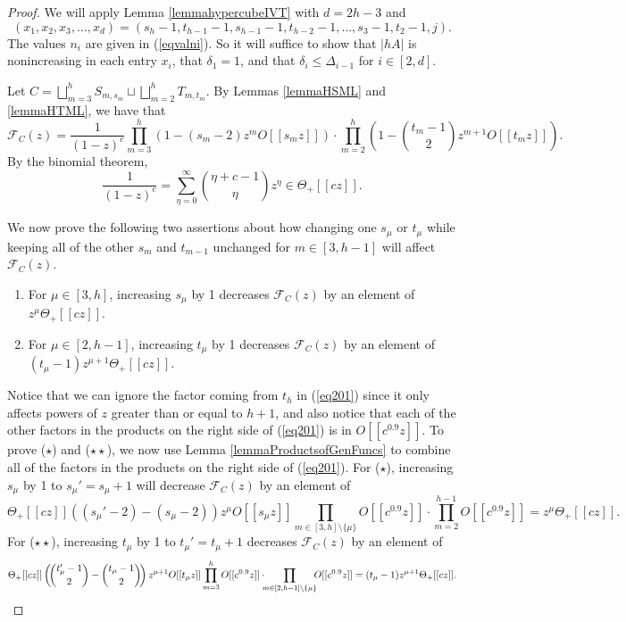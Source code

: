 \documentclass[10pt,a4paper]{article}
\theoremstyle{definition}
\theoremstyle{remark}
\numberwithin{equation}{section}
\numberwithin{theorem}{section}
\newcommand{\calf}{\mathcal{F}}
\begin{document}
\begin{proof}
    We will apply Lemma \ref{lemmahypercubeIVT} with $d = 2h-3$ and \[(x_1,x_2,x_3,\ldots,x_{d}) = (s_h-1,t_{h-1}-1,s_{h-1}-1,t_{h-2}-1,\ldots,s_{3}-1,t_2-1,j).\] The values $n_i$ are given in (\ref{eqvalni}). So it will suffice to show that $|hA|$ is nonincreasing in each entry $x_i$, that $\delta_1 = 1$, and that $\delta_i \leq \Delta_{i-1}$ for $i \in [2,d]$.

    Let $C = \displaystyle\bigsqcup_{m=3}^h S_{m,s_m} \sqcup \displaystyle\bigsqcup_{m=2}^h T_{m,t_m}$. By Lemmas \ref{lemmaHSML} and \ref{lemmaHTML}, we have that \begin{equation}\label{eq201}
        \calf_{C}(z) = \frac{1}{(1-z)^c} \prod_{m=3}^h (1-(s_m-2)z^mO[[s_mz]])\cdot  \prod_{m=2}^h \left(1-\binom{t_m-1}{2}z^{m+1}O[[t_mz]]\right).
    \end{equation} By the binomial theorem, \begin{equation}\label{eqbinomial}\frac{1}{(1-z)^c}= \sum_{\eta=0}^\infty \binom{\eta+c-1}{\eta} z^\eta \in \Theta_+[[c z]].\end{equation}
    
    We now prove the following two assertions about how changing one $s_\mu$ or $t_\mu$ while keeping all of the other $s_m$ and $t_{m-1}$ unchanged for $m \in [3,h-1]$ will affect $\calf_{C}(z)$.
    \begin{enumerate}[label = (\arabic*)]
        \item[($\star$)] For $\mu \in [3,h]$, increasing $s_\mu$ by 1 decreases $\calf_C(z)$ by an element of $z^\mu\Theta_+[[cz]]$.
        \item[($\star \star$)]  For $\mu \in [2,h-1]$, increasing $t_\mu$ by 1 decreases $\calf_C(z)$ by an element of $(t_\mu-1)z^{\mu+1}\Theta_+[[cz]]$.
    \end{enumerate}
    Notice that we can ignore the factor coming from $t_h$ in (\ref{eq201}) since it only affects powers of $z$ greater than or equal to $h+1$, and also notice that each of the other factors in the products on the right side of (\ref{eq201}) is in $O[[c^{0.9}z]]$. 
    To prove ($\star$) and ($\star \star$), we now use Lemma \ref{lemmaProductsofGenFuncs} to combine all of the factors in the products on the right side of (\ref{eq201}). For ($\star$), increasing $s_\mu$ by 1 to $s_\mu'=s_\mu+1$ will decrease $\calf_C(z)$ by an element of \[\Theta_+[[cz]]((s_\mu'-2)-(s_\mu-2))z^\mu O[[s_\mu z]]\prod_{m\in [3,h] \setminus \{\mu\}} O[[c^{0.9}z]] \cdot \prod_{m=2}^{h-1} O[[c^{0.9}z]] = z^\mu\Theta_+[[cz]].\] For ($\star \star$), increasing $t_\mu$ by 1 to $t_\mu'=t_\mu+1$ decreases $\calf_C(z)$ by an element of 
    \[\Theta_+[[cz]]\left(\hspace{-2 pt}\binom{t_\mu'-1}{2}-\binom{t_\mu-1}{2}\hspace{-2 pt}\right)z^{\mu+1}O[[t_\mu z]] \prod_{m=3}^h O[[c^{0.9}z]] \cdot \hspace{-4.5 pt}\prod_{m \in [2,h-1] \setminus \{\mu\}}\hspace{-4.5 pt} O[[c^{0.9}z]]= (t_\mu-1)z^{\mu+1} \Theta_+[[cz]].\]


\end{proof}
\end{document}
